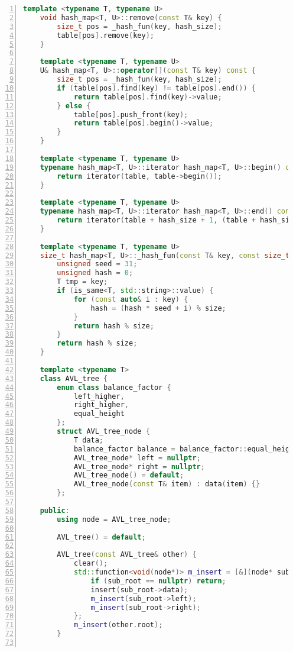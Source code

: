\documentclass{article}
\begin{document}
\begin{lstlisting}[xleftmargin = 2em,xrightmargin = 2em, aboveskip = 0.5em, numbers = left, language = C++]
    template <typename T, typename U>
    void hash_map<T, U>::remove(const T& key) {
        size_t pos = _hash_fun(key, hash_size);
        table[pos].remove(key);
    }

    template <typename T, typename U>
    U& hash_map<T, U>::operator[](const T& key) const {
        size_t pos = _hash_fun(key, hash_size);
        if (table[pos].find(key) != table[pos].end()) {
            return table[pos].find(key)->value;
        } else {
            table[pos].push_front(key);
            return table[pos].begin()->value;
        }
    }

    template <typename T, typename U>
    typename hash_map<T, U>::iterator hash_map<T, U>::begin() const {
        return iterator(table, table->begin());
    }

    template <typename T, typename U>
    typename hash_map<T, U>::iterator hash_map<T, U>::end() const {
        return iterator(table + hash_size + 1, (table + hash_size + 1)->end());
    }

    template <typename T, typename U>
    size_t hash_map<T, U>::_hash_fun(const T& key, const size_t& size) {
        unsigned seed = 31;
        unsigned hash = 0;
        T tmp = key;
        if (is_same<T, std::string>::value) {
            for (const auto& i : key) {
                hash = (hash * seed + i) % size;
            }
            return hash % size;
        }
        return hash % size;
    }

    template <typename T>
    class AVL_tree {
        enum class balance_factor {
            left_higher,
            right_higher,
            equal_height
        };
        struct AVL_tree_node {
            T data;
            balance_factor balance = balance_factor::equal_height;
            AVL_tree_node* left = nullptr;
            AVL_tree_node* right = nullptr;
            AVL_tree_node() = default;
            AVL_tree_node(const T& item) : data(item) {}
        };

    public:
        using node = AVL_tree_node;

        AVL_tree() = default;

        AVL_tree(const AVL_tree& other) {
            clear();
            std::function<void(node*)> m_insert = [&](node* sub_root) {
                if (sub_root == nullptr) return;
                insert(sub_root->data);
                m_insert(sub_root->left);
                m_insert(sub_root->right);
            };
            m_insert(other.root);
        }


\end{lstlisting}
\end{document}
